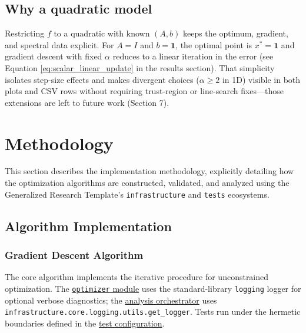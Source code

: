 \documentclass[
]{article}
\begin{document}
\subsection{Why a quadratic model}\label{why-a-quadratic-model}

Restricting \(f\) to a quadratic with known \((A,b)\) keeps the optimum,
gradient, and spectral data explicit. For \(A = I\) and
\(b = \mathbf{1}\), the optimal point is \(x^\ast = \mathbf{1}\) and
gradient descent with fixed \(\alpha\) reduces to a linear iteration in
the error (see Equation \ref{eq:scalar_linear_update} in the results
section). That simplicity isolates step-size effects and makes divergent
choices (\(\alpha \geq 2\) in 1D) visible in both plots and CSV rows
without requiring trust-region or line-search fixes---those extensions
are left to future work (Section 7).

\newpage

\section{Methodology}\label{methodology}

This section describes the implementation methodology, explicitly
detailing how the optimization algorithms are constructed, validated,
and analyzed using the Generalized Research Template's
\texttt{infrastructure} and \texttt{tests} ecosystems.

\subsection{Algorithm Implementation}\label{algorithm-implementation}

\subsubsection{Gradient Descent
Algorithm}\label{gradient-descent-algorithm}

The core algorithm implements the iterative procedure for unconstrained
optimization. The
\href{https://github.com/docxology/template/blob/main/projects/code_project/src/optimizer.py}{\texttt{optimizer}
module} uses the standard-library \texttt{logging} logger for optional
verbose diagnostics; the
\href{https://github.com/docxology/template/blob/main/projects/code_project/scripts/optimization_analysis.py}{analysis
orchestrator} uses
\texttt{infrastructure.core.logging.utils.get\_logger}. Tests run under
the hermetic boundaries defined in the
\href{https://github.com/docxology/template/blob/main/projects/code_project/tests/conftest.py}{test
configuration}.
\end{document}
